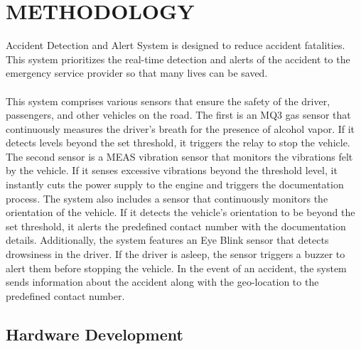\documentclass[12pt,a4paper]{report}
\begin{document}
	\chapter{METHODOLOGY}
 \begin{justify}
     
	Accident Detection and Alert System is designed to reduce accident fatalities. This system prioritizes the real-time detection and alerts of the accident to the emergency service provider so that many lives can be saved.\\\\
This system comprises various sensors that ensure the safety of the driver, passengers, and other vehicles on the road. The first is an MQ3 gas sensor that continuously measures the driver's breath for the presence of alcohol vapor. If it detects levels beyond the set threshold, it triggers the relay to stop the vehicle. The second sensor is a MEAS vibration sensor that monitors the vibrations felt by the vehicle. If it senses excessive vibrations beyond the threshold level, it instantly cuts the power supply to the engine and triggers the documentation process. The system also includes a sensor that continuously monitors the orientation of the vehicle. If it detects the vehicle's orientation to be beyond the set threshold, it alerts the predefined contact number with the documentation details. Additionally, the system features an Eye Blink sensor that detects drowsiness in the driver. If the driver is asleep, the sensor triggers a buzzer to alert them before stopping the vehicle. In the event of an accident, the system sends information about the accident along with the geo-location to the predefined contact number.
 \end{justify}
\newpage
	\section{Hardware Development}
\end{document}
